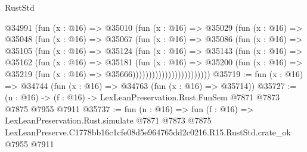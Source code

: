 \begin{lexlean}{RustStd}
\begin{coremodule}
                        @34991
                          (fun (x : @16) =>
                          @35010
                            (fun (x : @16) =>
                            @35029
                              (fun (x : @16) =>
                              @35048
                                (fun (x : @16) =>
                                @35067
                                  (fun (x : @16) =>
                                  @35086
                                    (fun (x : @16) =>
                                    @35105
                                      (fun (x : @16) =>
                                      @35124
                                        (fun (x : @16) =>
                                        @35143
                                          (fun (x : @16) =>
                                          @35162
                                            (fun (x : @16) =>
                                            @35181
                                              (fun (x : @16) =>
                                              @35200
                                                (fun (x : @16) =>
                                                @35219
                                                  (fun (x : @16) => @35666))))))))))))))))))))))))
@35719 := fun (x : @16) => @34744 (fun (x : @16) => @34763 (fun (x : @16) => @35714))
@35727 := (n : @16) -> (f : @16) -> LexLeanPreservation.Rust.FunSem @7871 @7873 @7875 @7955 @7911
@35737 := fun (n : @16) =>
  fun (f : @16) =>
  LexLeanPreservation.Rust.simulate
    @7871
    @7873
    @7875
    LexLeanPreserve.C1778bb16c1cfe08d5e964765dd2c0216.R15.RustStd.crate_ok
    @7955
    @7911
\end{coremodule}
\end{lexlean}
